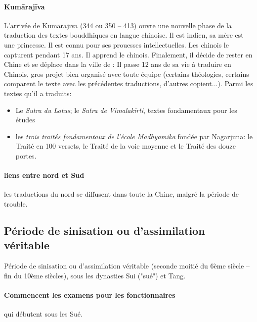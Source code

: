 \paragraph{Kumārajīva} L’arrivée de Kumārajīva
 (344 ou 350 – 413) ouvre une nouvelle phase de la traduction des textes bouddhiques en langue chinoise. Il est indien, sa mère est une princesse. Il est connu pour ses prouesses intellectuelles. Les chinois le capturent pendant 17 ans. Il apprend le chinois. Finalement, il décide de rester en Chine et se déplace dans la ville de : 
 Il passe 12 ans de sa vie à traduire en Chinois, gros projet bien organisé avec toute équipe (certains théologies, certains comparent le texte avec les précédentes traductions, d'autres copient...). 
Parmi les textes qu’il a traduits:
\begin{itemize}
    \item  	Le \textit{Sutra du Lotus}; le \textit{Sutra de Vimalakīrti}, textes fondamentaux pour les études
 \item 	les \textit{trois traités fondamentaux de l’école Madhyamika} fondée par Nāgārjuna: le Traité en 100 versets, le Traité de la voie moyenne et le Traité des douze portes.
\end{itemize}



\paragraph{liens entre nord et Sud} les traductions du nord se diffusent dans toute la Chine, malgré la période de trouble.


 \subsection{Période de sinisation ou d’assimilation véritable}

Période de sinisation ou d’assimilation véritable (seconde moitié du 6ème siècle – fin du 10ème siècles), sous les dynasties Sui ("sué") et Tang.

\paragraph{Commencent les examens pour les fonctionnaires} qui débutent sous les Sué. 
  



